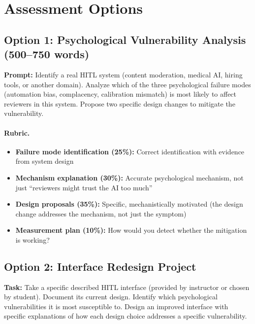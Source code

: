 \section{Assessment Options}

\subsection{Option 1: Psychological Vulnerability Analysis (500--750 words)}

\textbf{Prompt:} Identify a real HITL system (content moderation, medical AI, hiring tools, or another domain). Analyze which of the three psychological failure modes (automation bias, complacency, calibration mismatch) is most likely to affect reviewers in this system. Propose two specific design changes to mitigate the vulnerability.

\paragraph{Rubric.}
\begin{itemize}
    \item \textbf{Failure mode identification (25\%):} Correct identification with evidence from system design
    \item \textbf{Mechanism explanation (30\%):} Accurate psychological mechanism, not just ``reviewers might trust the AI too much''
    \item \textbf{Design proposals (35\%):} Specific, mechanistically motivated (the design change addresses the mechanism, not just the symptom)
    \item \textbf{Measurement plan (10\%):} How would you detect whether the mitigation is working?
\end{itemize}

\subsection{Option 2: Interface Redesign Project}

\textbf{Task:} Take a specific described HITL interface (provided by instructor or chosen by student). Document its current design. Identify which psychological vulnerabilities it is most susceptible to. Design an improved interface with specific explanations of how each design choice addresses a specific vulnerability.


